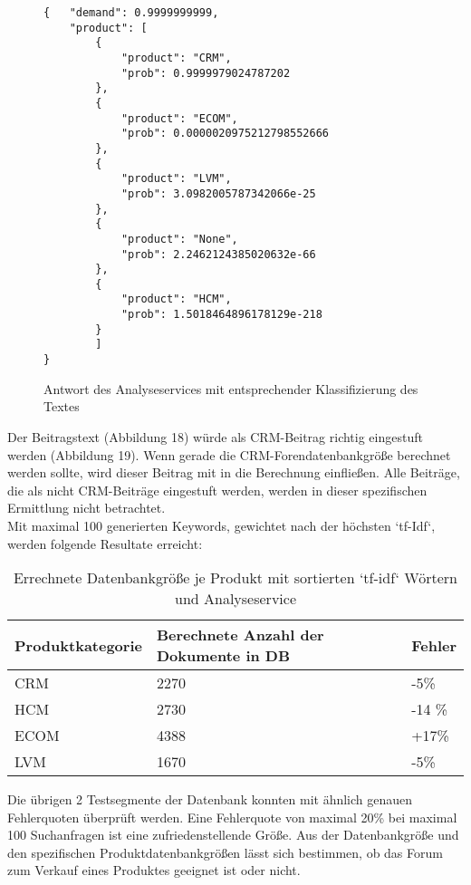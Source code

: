 \newpage

\begin{figure}[h!]
\begin{lstlisting}[language=HTML5]
{   "demand": 0.9999999999,
    "product": [
        {
            "product": "CRM",
            "prob": 0.9999979024787202
        },
        {
            "product": "ECOM",
            "prob": 0.0000020975212798552666
        },
        {
            "product": "LVM",
            "prob": 3.0982005787342066e-25
        },
        {
            "product": "None",
            "prob": 2.2462124385020632e-66
        },
        {
            "product": "HCM",
            "prob": 1.5018464896178129e-218
        }
		]
}
\end{lstlisting}
\caption{Antwort des Analyseservices mit entsprechender Klassifizierung des Textes}
\end{figure}

Der Beitragstext (Abbildung 18) würde als CRM-Beitrag richtig eingestuft werden (Abbildung 19). Wenn gerade die CRM-Forendatenbankgröße berechnet werden sollte, wird dieser Beitrag mit in die Berechnung einfließen. Alle Beiträge, die als nicht CRM-Beiträge eingestuft werden, werden in dieser spezifischen Ermittlung nicht betrachtet.\\
Mit maximal 100 generierten Keywords, gewichtet nach der höchsten `tf-Idf`, werden folgende Resultate erreicht:

\begin{table}[h!]
\begin{tabular}{ | p{3cm} | l | l |}
\hline
\textbf{Produktkategorie} & \textbf{Berechnete Anzahl der Dokumente in DB} & \textbf{Fehler} \\ \hline
CRM & 2270 & -5\% \\ \hline
HCM & 2730 & -14 \% \\ \hline
ECOM & 4388 & +17\% \\ \hline
LVM & 1670 & -5\% \\ \hline
\end{tabular}
\caption{Errechnete Datenbankgröße je Produkt mit sortierten `tf-idf` Wörtern und Analyseservice}
\end{table}

Die übrigen 2 Testsegmente der Datenbank konnten mit ähnlich genauen Fehlerquoten überprüft werden.
Eine Fehlerquote von maximal 20\% bei maximal 100 Suchanfragen ist eine zufriedenstellende Größe. Aus der Datenbankgröße und den spezifischen Produktdatenbankgrößen lässt sich bestimmen, ob das Forum zum Verkauf eines Produktes geeignet ist oder nicht.
